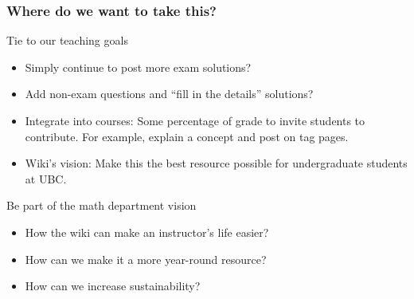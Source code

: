 \documentclass{beamer}
\begin{document}
\frame
{
  \frametitle{Where do we want to take this?}

\begin{block}{Tie to our teaching goals}
      \begin{itemize}
            \item Simply continue to post more exam solutions?
            \item Add non-exam questions and ``fill in the details'' solutions? %
            \item Integrate into courses: Some percentage of grade to invite students to contribute. For example, explain a concept and post on tag pages.
            \item \alert{Wiki's vision:} Make this the best resource possible for undergraduate students at UBC.
      \end{itemize}
\end{block}



\begin{block}{Be part of the math department vision}
        \begin{itemize}
            \item How the wiki can make an instructor's life easier?
            \item How can we make it a more year-round resource?
            \item How can we increase sustainability?
        \end{itemize}
\end{block}

}
\end{document}
